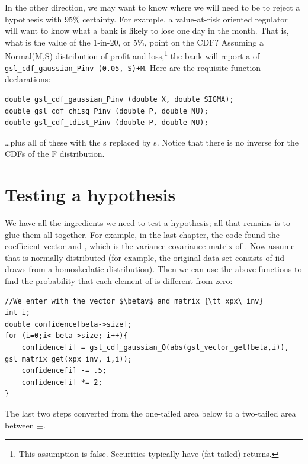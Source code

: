 In the other direction, we may want to know where we will need to be to reject a hypothesis with 95\%
certainty. For example, a value-at-risk oriented regulator will want to know what a bank is likely to lose 
one day in the month. That is, what is the value of the 1-in-20, or 5\%, point on the CDF?
Assuming a Normal(M,S) distribution of profit and loss,\footnote{This assumption is false. Securities
typically have  (fat-tailed) returns.} the bank will report a  of {\tt
gsl\_cdf\_gaussian\_Pinv (0.05, S)+M}. Here are the requisite function declarations:
\begin{lstlisting}
double gsl_cdf_gaussian_Pinv (double X, double SIGMA);
double gsl_cdf_chisq_Pinv (double P, double NU);
double gsl_cdf_tdist_Pinv (double P, double NU);
\end{lstlisting}
\dots plus all of these with the s replaced by s.
Notice that there is no inverse for the CDFs of the F distribution.





\section{Testing a hypothesis}




We have all the ingredients we need to test a hypothesis; all that
remains is to glue them all together. For example, in the last chapter, the code
found the coefficient vector  and , which is the
variance-covariance matrix of .  Now assume that 
is normally distributed (for example, the original data set consists
of iid draws from a homoskedatic distribution). Then we can use the
above functions to find the probability that each element of 
is different from zero:

\lstset{texcl=true}
\begin{lstlisting}
//We enter with the vector $\betav$ and matrix {\tt xpx\_inv}
int i;
double confidence[beta->size];
for (i=0;i< beta->size; i++){
    confidence[i] = gsl_cdf_gaussian_Q(abs(gsl_vector_get(beta,i)), gsl_matrix_get(xpx_inv, i,i));
    confidence[i] -= .5;
    confidence[i] *= 2;
}
\end{lstlisting}
\lstset{texcl=false}
The last two steps converted from the one-tailed area below 
to a two-tailed area between $\pm$.


